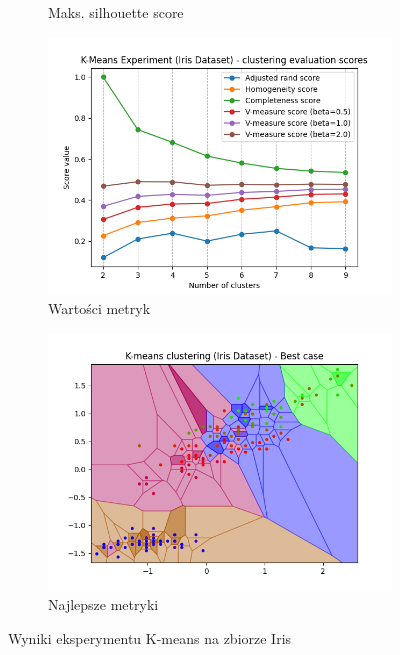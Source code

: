 \documentclass[12pt]{article}
\begin{document}
\begin{figure}[H]
\begin{subfigure}[t]{0.24\textwidth}
        \caption{Maks. silhouette score}
    \end{subfigure}
    \hfill
    \begin{subfigure}[t]{0.24\textwidth}
        \includegraphics[width=\linewidth]{img/other_datasets/iris_kmeans_scores.png}
        \caption{Wartości metryk}
    \end{subfigure}
    \begin{subfigure}[t]{0.24\textwidth}
        \includegraphics[width=\linewidth]{img/other_datasets/iris_kmeans_best.png}
        \caption{Najlepsze metryki}
    \end{subfigure}
    \caption{Wyniki eksperymentu K-means na zbiorze Iris}
\end{figure}
\end{document}
